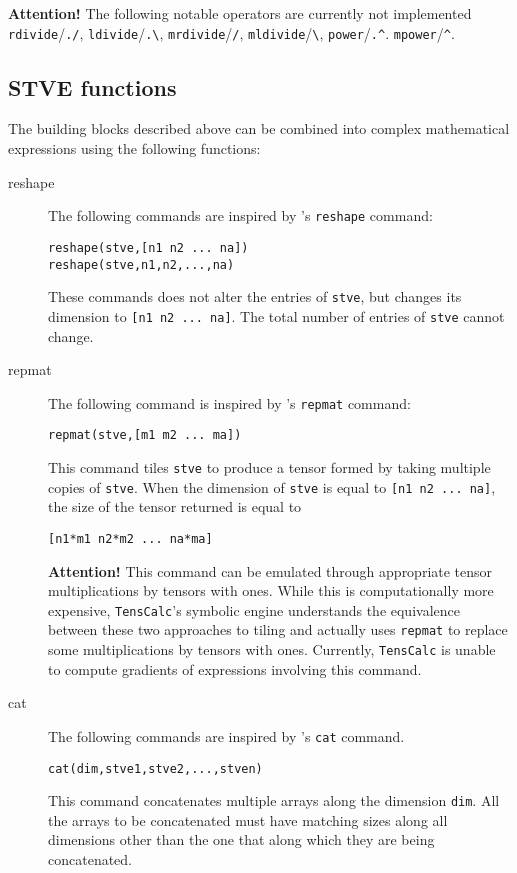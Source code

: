\documentclass[11pt]{article}
\newcommand{\TC}{\texttt{TensCalc}}
\theoremstyle{remark}
\begin{document}
\noindent
\textbf{Attention!}
The following notable operators are currently not implemented
\lstinline{rdivide}/\lstinline{./}, 
\lstinline{ldivide}/\lstinline{.\}, 
\lstinline{mrdivide}/\lstinline{/}, 
\lstinline{mldivide}/\lstinline{\}, 
\lstinline{power}/\lstinline{.^}.
\lstinline{mpower}/\lstinline{^}.

\subsection{STVE functions}

The building blocks described above can be combined into complex
mathematical expressions using the following functions:
\begin{description}
\item[reshape] The following commands are inspired by \matlab's
  \lstinline{reshape} command:
\begin{lstlisting}
reshape(stve,[n1 n2 ... na])
reshape(stve,n1,n2,...,na)
\end{lstlisting}
  These commands does not alter the entries of \lstinline{stve}, but
  changes its dimension to \lstinline{[n1 n2 ... na]}. The total
  number of entries of \lstinline{stve} cannot change.
 
\item[repmat] The following command is inspired by \matlab's
  \lstinline{repmat} command:
\begin{lstlisting}
repmat(stve,[m1 m2 ... ma])
\end{lstlisting}
  This command tiles \lstinline{stve} to produce a tensor formed by taking
  multiple copies of \lstinline{stve}. When the dimension of
  \lstinline{stve} is equal to \lstinline{[n1 n2 ... na]}, the size of
  the tensor returned is equal to
\begin{lstlisting}
[n1*m1 n2*m2 ... na*ma]
\end{lstlisting}

  \textbf{Attention!} This command can be emulated through appropriate
  tensor multiplications by tensors with ones. While this is
  computationally more expensive, \TC's symbolic engine understands
  the equivalence between these two approaches to tiling and actually
  uses \lstinline{repmat} to replace some multiplications by tensors
  with ones. Currently, \TC{} is unable to compute gradients of
  expressions involving this command.
  
\item[cat] The following commands are inspired by \matlab's
  \lstinline{cat} command.
\begin{lstlisting}
cat(dim,stve1,stve2,...,stven)
\end{lstlisting}
  This command concatenates multiple arrays along the dimension
  \lstinline{dim}. All the arrays to be concatenated must have
  matching sizes along all dimensions other than the one that along
  which they are being concatenated.


\end{description}
\end{document}
